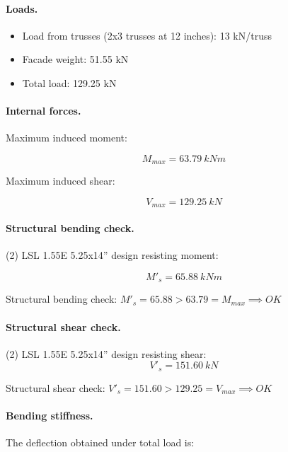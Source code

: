 \paragraph{Loads.}

\begin{itemize}
\item Load from trusses (2x3 trusses at 12 inches): 13 kN/truss
\item Facade weight: 51.55 kN
\item Total load: 129.25 kN
\end{itemize}

\paragraph{Internal forces.}

\noindent Maximum induced moment:

\begin{equation}
  M_{max}= 63.79\ kN m
\end{equation}

\noindent Maximum induced shear:

\begin{equation}
  V_{max}= 129.25\ kN
\end{equation}

\paragraph{Structural bending check.}

\noindent (2) LSL 1.55E 5.25x14'' design resisting moment:

\begin{equation}
  M'_s= 65.88\ kN m
\end{equation}

\noindent Structural bending check: $M'_s = 65.88 > 63.79 = M_{max} \implies OK$

\paragraph{Structural shear check.}

\noindent (2) LSL 1.55E 5.25x14'' design resisting shear:
\begin{equation}
  V'_s= 151.60\ kN
\end{equation}

\noindent Structural shear check: $V'_s = 151.60 > 129.25 = V_{max} \implies OK$

\paragraph{Bending stiffness.}
The deflection obtained under total load is:

